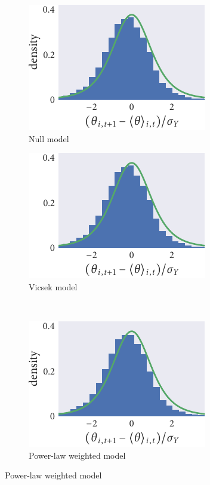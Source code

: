 \begin{figure}[tbp]
  \begin{subfigure}[t]{0.33333\textwidth}
    \caption{Null model}
    \includegraphics{seq2/null_residuals.pdf}
  \end{subfigure}\hspace{2pt}
  \begin{subfigure}[t]{0.33333\textwidth}
    \caption{Vicsek model}
    \includegraphics{seq2/r_residuals.pdf}
  \end{subfigure}\vspace{1em}\\
  \begin{subfigure}[t]{0.33333\textwidth}
    \includegraphics{seq2/power_residuals.pdf}
    \caption{Power-law weighted model}

\end{subfigure}
\end{figure}
